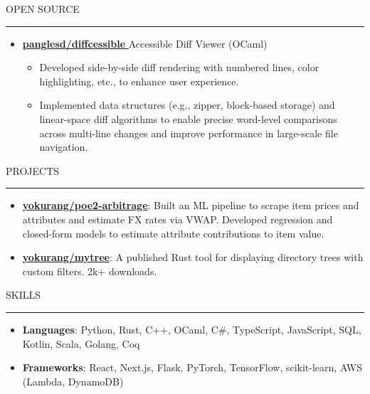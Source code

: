 \documentclass[letterpaper, 11pt]{article}
\makeatletter
\def\sectionlineskip{\medskip}
\def\sectionskip{\medskip}
\def \entryspacing {-0pt}
\newcommand{\SectionHeading}[1]{
  \sectionskip
  \raggedright\raggedbottom\MakeUppercase{\large{#1}}
  \sectionlineskip
  \hrule
  \color{black}
}
\newcommand{\ResumeEntryTSDL}[4]{
  \vspace{1pt}\item
    \begin{tabular*}{\textwidth}[t]{l@{\extracolsep{\fill}}r} 
      \textbf{#1} & #2 \\
      #3 & #4 \\
    \end{tabular*}\vspace{-2.835pt} %
}
\newcommand{\ResumeItem}[2]{
  \item{
    \textbf{#1}{: #2 \vspace{-2.835pt}}
  }
}
\newcommand{\ResumeItemDefault}[1]{
  \item{
    #1 \vspace{-2.835pt}
  }
}
\newcommand{\ResumeProjectItem}[3]{
  \item{
    \href{#2}{\textbf{#1}}{: #3 \vspace{-2.835pt}}
  }
}
\newcommand{\ResumeEntryStart}{\begin{itemize}[leftmargin=0mm, label={}]}
\newcommand{\ResumeEntryEnd}{\end{itemize}\vspace{-2.835pt}} %
\newcommand{\ResumeItemListStart}{\begin{itemize}[leftmargin=5mm, label=$\bullet$, itemsep=1mm, parsep=1mm]} %
\newcommand{\ResumeItemListEnd}{\end{itemize}}
\newcommand{\ProjectItemListStart}{\begin{itemize}[leftmargin=*, label=$\bullet$]}
\newcommand{\ProjectItemListEnd}{\end{itemize}\vspace{\entryspacing}}
\newcommand{\OpenSourceProjectItem}[3]{
  \item{
    \href{#1}{\textbf{#2} }\hfill{#3}\vspace{-2.835pt}
  }
}
\makeatother
\begin{document}

  \SectionHeading{Open Source}
  \ResumeEntryStart
  \OpenSourceProjectItem{https://github.com/panglesd/diffcessible}{panglesd/diffcessible}{Accessible Diff Viewer (OCaml)}
  \ResumeItemListStart
    \ResumeItemDefault{Developed side-by-side diff rendering with numbered lines, color highlighting, etc., to enhance user experience.}
    \ResumeItemDefault{Implemented data structures (e.g., zipper, block-based storage) and linear-space diff algorithms to enable precise word-level comparisons across multi-line changes and improve performance in large-scale file navigation.}
  \ResumeItemListEnd
  \ResumeEntryEnd
  
  \SectionHeading{Projects}
  \ProjectItemListStart
  \ResumeProjectItem{yokurang/poe2-arbitrage}
  {https://github.com/yokurang/path-of-elixe}
  {Built an ML pipeline to scrape item prices and attributes and estimate FX rates via VWAP. Developed regression and closed-form models to estimate attribute contributions to item value.}



  \ResumeProjectItem{yokurang/mytree}
  {https://github.com/yokurang/mytree}
  {A published Rust tool for displaying directory trees with custom filters. 2k+ downloads.}
  
  \ProjectItemListEnd

  \SectionHeading{Skills}
  \ResumeEntryStart
    \ResumeItem{Languages}{ Python, Rust, C++, OCaml, C\#, TypeScript, JavaScript, SQL, Kotlin, Scala, Golang, Coq }
    \ResumeItem{Frameworks}{ React, Next.js, Flask, PyTorch, TensorFlow, scikit-learn, AWS (Lambda, DynamoDB) }
  \ResumeEntryEnd
\end{document}
